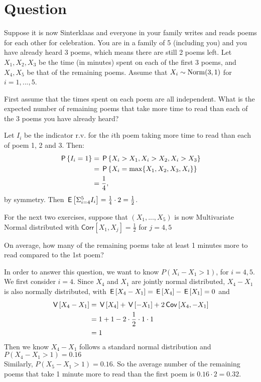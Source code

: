 \section*{Question}

Suppose it is now Sinterklaas and everyone in your family writes and reads poems for each other for celebration. You are in a family of 5 (including you) and you have already heard 3 poems, which means there are still 2 poems left. Let $X_1, X_2, X_3$ be the time (in minutes) spent on each of the first 3 poems, and $X_4, X_5$ be that of the remaining poems. Assume that $X_i\sim \Norm{3, 1}$ for $i=1,...,5$.

\begin{exercise}[1.5]
 First assume that the times spent on each poem are all independent. What is the expected number of remaining poems that take more time to read than each of the 3 poems you have already heard?
\begin{solution}
 Let $I_i$ be the indicator r.v. for the $i$th poem taking more time to read than each of poem 1, 2 and 3. Then:
    \begin{align*}
        \P{I_i=1}&=\P{X_i>X_1, X_i>X_2, X_i>X_3}\\
        &=\P{X_i = \max\{X_1, X_2,X_3, X_i\}} \\
        &=\frac14,
    \end{align*}
    by symmetry.
    Then $\E{\Sigma_{i=4}^{5}I_i}=\frac{1}{4}\cdot 2=\frac12$.
\end{solution}
\end{exercise}

For the next two exercises, suppose that $(X_1,...,X_5)$ is now Multivariate Normal distributed with $\mathsf{Corr}\left[X_1,X_j\right]=\frac{1}{2}$ for $j=4, 5$


\begin{exercise}[2.5]
On average, how many of the remaining poems take at least 1 minutes more to read compared to the 1st poem? 
\begin{solution}
 In order to answer this question, we want to know $P(X_i-X_1>1)$, for $i=4, 5$. We first consider $i=4$. Since $X_4$ and $X_1$ are jointly normal distributed, $X_4-X_1$ is also normally distributed, with $\E{X_4-X_1}=\E{X_4}-\E{X_1}=0$ and 
    \begin{align*}
        \V{X_4-X_1}&=\V{X_4}+\V{-X_1}+2\cov{X_4,-X_1}\\
        &=1+1-2\cdot\frac{1}{2}\cdot 1\cdot 1\\
        &=1
    \end{align*}
    Then we know $X_4-X_1$ follows a standard normal distribution and $P(X_4-X_1>1)=0.16$\\
    Similarly,  $P(X_5-X_1>1)=0.16$. So the average number of the remaining poems that take 1 minute more to read than the first poem is $0.16\cdot2=0.32.$
 
\end{solution}
\end{exercise}




